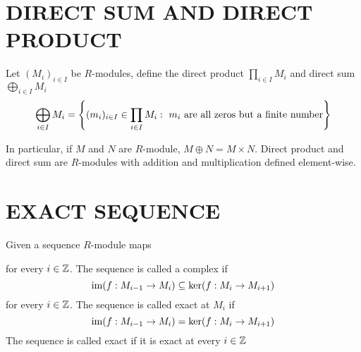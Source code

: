 \section{DIRECT SUM AND DIRECT PRODUCT}

\begin{definition}
	Let $(M_i)_{i \in I}$ be $R$-modules, define  the direct product $\prod_{i \in I} M_i$ and direct sum $\bigoplus_{i \in I} M_i$
	$$
		\bigoplus_{i \in I} M_i = \set*{(m_i)_{i \in I} \in \prod_{i \in I} M_i: \text{ $m_i$ are all zeros but a finite number}}
	$$
	
	In particular, if $M$ and $N$ are $R$-module, $M \oplus N = M \times N$. Direct product and direct sum are $R$-modules with addition and multiplication defined element-wise.
\end{definition}

\section{EXACT SEQUENCE}

\begin{definition}
	Given a sequence $R$-module maps
	\begin{center}
	\end{center}
	for every $i \in \Z$. The sequence is called a complex if
	$$
		\im (f: M_{i-1} \to M_i) \subseteq \ker (f: M_i \to M_{i+1})
	$$
	for every $i \in \Z$. The sequence is called exact at $M_i$ if 
	$$
		\im (f: M_{i-1} \to M_i) = \ker (f: M_i \to M_{i+1})
	$$
	The sequence is called exact if it is exact at every $i \in \Z$
\end{definition}

